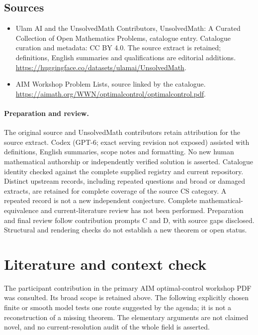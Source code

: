 \documentclass[11pt]{article}
\begin{document}
\subsection{Sources}
\begin{itemize}
\item[S1] Ulam AI and the UnsolvedMath Contributors, UnsolvedMath: A Curated Collection of Open Mathematics Problems, catalogue entry. Catalogue curation and metadata: CC BY 4.0. The source extract is retained; definitions, English summaries and qualifications are editorial additions.
\url{https://huggingface.co/datasets/ulamai/UnsolvedMath}.
\item[S2] AIM Workshop Problem Lists, source linked by the catalogue.
\url{https://aimath.org/WWN/optimalcontrol/optimalcontrol.pdf}.
\end{itemize}
\paragraph{Preparation and review.}
The original source and UnsolvedMath contributors retain attribution for the source extract. Codex (GPT-6; exact serving revision not exposed) assisted with definitions, English summaries, scope notes and formatting. No new human mathematical authorship or independently verified solution is asserted. Catalogue identity checked against the complete supplied registry and current repository. Distinct upstream records, including repeated questions and broad or damaged extracts, are retained for complete coverage of the source CS category. A repeated record is not a new independent conjecture. Complete mathematical-equivalence and current-literature review has not been performed. Preparation and final review follow contribution prompts C and D, with source gaps disclosed. Structural and rendering checks do not establish a new theorem or open status.
\label{end:statement}

\section{Literature and context check}
The participant contribution in the primary AIM optimal-control workshop
 PDF was consulted. Its broad scope is retained above. The following explicitly
 chosen finite or smooth model tests one route suggested by the agenda; it is
 not a reconstruction of a missing theorem. The elementary arguments are not
 claimed novel, and no current-resolution audit of the whole field is asserted.
\end{document}
